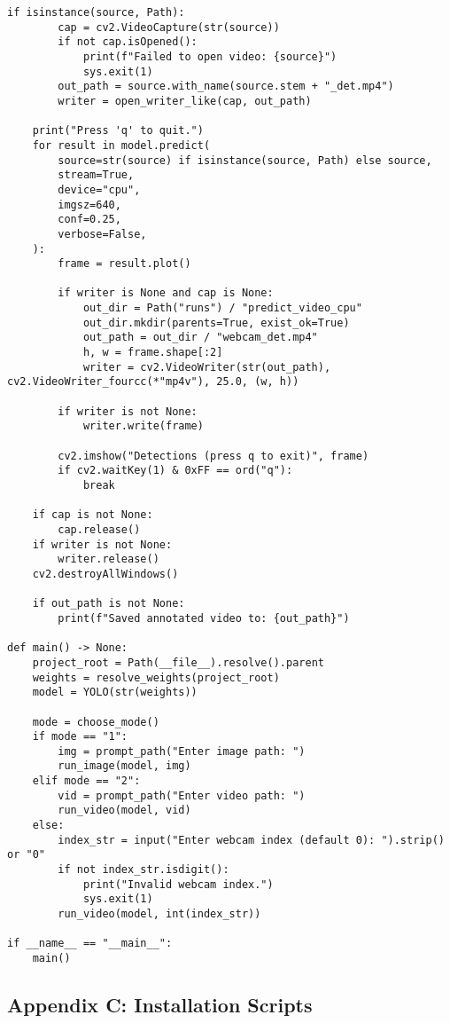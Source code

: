 \documentclass[12pt,a4paper]{article}
\begin{document}
\begin{lstlisting}[caption=Complete Detection Implementation]
    if isinstance(source, Path):
        cap = cv2.VideoCapture(str(source))
        if not cap.isOpened():
            print(f"Failed to open video: {source}")
            sys.exit(1)
        out_path = source.with_name(source.stem + "_det.mp4")
        writer = open_writer_like(cap, out_path)

    print("Press 'q' to quit.")
    for result in model.predict(
        source=str(source) if isinstance(source, Path) else source,
        stream=True,
        device="cpu",
        imgsz=640,
        conf=0.25,
        verbose=False,
    ):
        frame = result.plot()

        if writer is None and cap is None:
            out_dir = Path("runs") / "predict_video_cpu"
            out_dir.mkdir(parents=True, exist_ok=True)
            out_path = out_dir / "webcam_det.mp4"
            h, w = frame.shape[:2]
            writer = cv2.VideoWriter(str(out_path), cv2.VideoWriter_fourcc(*"mp4v"), 25.0, (w, h))

        if writer is not None:
            writer.write(frame)

        cv2.imshow("Detections (press q to exit)", frame)
        if cv2.waitKey(1) & 0xFF == ord("q"):
            break

    if cap is not None:
        cap.release()
    if writer is not None:
        writer.release()
    cv2.destroyAllWindows()

    if out_path is not None:
        print(f"Saved annotated video to: {out_path}")

def main() -> None:
    project_root = Path(__file__).resolve().parent
    weights = resolve_weights(project_root)
    model = YOLO(str(weights))

    mode = choose_mode()
    if mode == "1":
        img = prompt_path("Enter image path: ")
        run_image(model, img)
    elif mode == "2":
        vid = prompt_path("Enter video path: ")
        run_video(model, vid)
    else:
        index_str = input("Enter webcam index (default 0): ").strip() or "0"
        if not index_str.isdigit():
            print("Invalid webcam index.")
            sys.exit(1)
        run_video(model, int(index_str))

if __name__ == "__main__":
    main()
\end{lstlisting}

\subsection{Appendix C: Installation Scripts}
\end{document}
